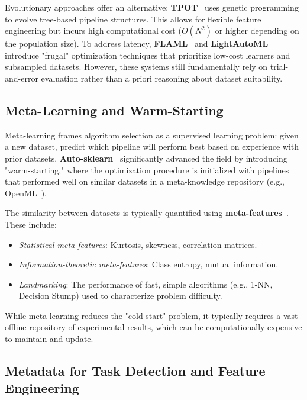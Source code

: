 \documentclass[conference]{llncs}
\begin{document}
   Evolutionary approaches offer an alternative; \textbf{TPOT}~\cite{olson2016tpot} uses genetic programming to evolve tree-based pipeline structures. This allows for flexible feature engineering but incurs high computational cost ($O(N^2)$ or higher depending on the population size). To address latency, \textbf{FLAML}~\cite{wang2021flaml} and \textbf{LightAutoML} introduce "frugal" optimization techniques that prioritize low-cost learners and subsampled datasets. However, these systems still fundamentally rely on trial-and-error evaluation rather than a priori reasoning about dataset suitability.

   \subsection{Meta-Learning and Warm-Starting}

   Meta-learning frames algorithm selection as a supervised learning problem: given a new dataset, predict which pipeline will perform best based on experience with prior datasets. \textbf{Auto-sklearn}~\cite{feurer2015efficient} significantly advanced the field by introducing "warm-starting," where the optimization procedure is initialized with pipelines that performed well on similar datasets in a meta-knowledge repository (e.g., OpenML~\cite{vanschoren2013openml}).

   The similarity between datasets is typically quantified using \textbf{meta-features}~\cite{brazil2010metalearning,leite2012survey,vinyals2016matching,bengio2022meta}. These include:
   \begin{itemize}
       \item \emph{Statistical meta-features}: Kurtosis, skewness, correlation matrices.
       \item \emph{Information-theoretic meta-features}: Class entropy, mutual information.
       \item \emph{Landmarking}: The performance of fast, simple algorithms (e.g., 1-NN, Decision Stump) used to characterize problem difficulty.
   \end{itemize}
   While meta-learning reduces the "cold start" problem, it typically requires a vast offline repository of experimental results, which can be computationally expensive to maintain and update.

   \subsection{Metadata for Task Detection and Feature Engineering}
\end{document}
